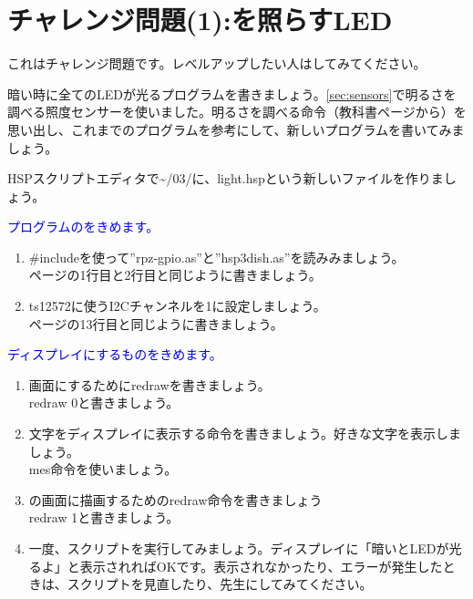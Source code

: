 \section{チャレンジ問題(1):を照らすLED}
\label{Yamiyo}
これはチャレンジ問題です。レベルアップしたい人はしてみてください。

暗い時に全てのLEDが光るプログラムを書きましょう。\ref{sec:sensors}で明るさを調べる照度センサーを使いました。明るさを調べる命令（教科書\pageref{sec:sensors}ページから）を思い出し、これまでのプログラムを参考にして、新しいプログラムを書いてみましょう。\\
\begin{enumerate}
\renewcommand{\theenumii}{\arabic{enumii}}
\renewcommand{\labelenumii}{\theenumi.\theenumii}
\item HSPスクリプトエディタで\textasciitilde /03/に、light.hspという新しいファイルを作りましょう。
\textcolor{blue}{\item プログラムのをきめます。}
\begin{enumerate}
\item \#includeを使って”rpz-gpio.as”と”hsp3dish.as”を読みみましょう。\\
\pageref{sensors.hsp}ページの1行目と2行目と同じように書きましょう。
\item ts12572に使うI2Cチャンネルを1に設定しましょう。\\
\pageref{sensors.hsp}ページの13行目と同じように書きましょう。
\end{enumerate}
\textcolor{blue}{\item ディスプレイにするものをきめます。}
\begin{enumerate}
\item {}画面にするためにredrawを書きましょう。\\
redraw 0と書きましょう。
\item 文字をディスプレイに表示する命令を書きましょう。好きな文字を表示しましょう。\\
mes命令を使いましょう。
\item {}の画面に描画するためのredraw命令を書きましょう\\
redraw 1と書きましょう。
\item 一度、スクリプトを実行してみましょう。ディスプレイに「暗いとLEDが光るよ」と表示されればOKです。表示されなかったり、エラーが発生したときは、スクリプトを見直したり、先生にしてみてください。

\end{enumerate}
\end{enumerate}
